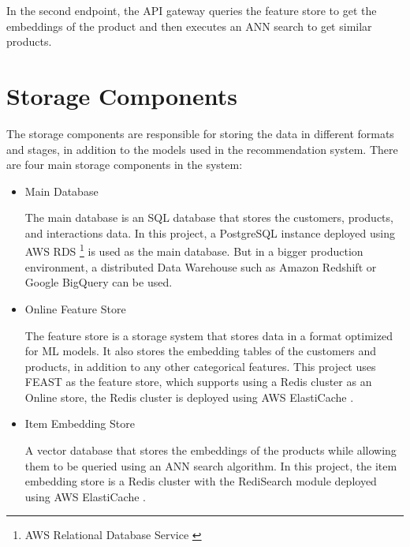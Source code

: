 In the second endpoint, the API gateway queries the feature store to get the embeddings of the product and then executes an ANN search to get similar products.

\section{Storage Components}

The storage components are responsible for storing the data in different formats and stages, in addition to the models used in the recommendation system.
There are four main storage components in the system:

\begin{itemize}
    \item Main Database
    \begin{displayquote}
        The main database is an SQL database that stores the customers, products, and
         interactions data. In this project, a PostgreSQL \cite{Postgres} instance 
         deployed using AWS RDS \footnote{AWS Relational Database Service \cite{AwsRDS}}
         is used as the main database. 
         But in a bigger production environment, a distributed Data Warehouse such as 
         Amazon Redshift \cite{AwsRedshift} or Google BigQuery \cite{GoogleBigQuery} can be used.
    \end{displayquote}
    \item Online Feature Store
    \begin{displayquote}
        The feature store is a storage system that stores data in a format optimized for ML models. \cite{NvidiaFeatureStores}
        It also stores the embedding tables of the customers 
        and products, in addition to any other categorical features.
        This project uses FEAST \cite{feast} as the feature store, which supports using a Redis \cite{Redis} 
        cluster as an Online store, the Redis cluster is deployed using AWS ElastiCache \cite{AwsElastiCache}.
    \end{displayquote}

    \item Item Embedding Store
    \begin{displayquote}
        A vector database that stores the embeddings of the products
        while allowing them to be queried using an ANN search algorithm. 
        In this project, the item embedding store is a Redis \cite{Redis} cluster with the RediSearch \cite{RediSearch} module deployed using AWS ElastiCache \cite{AwsElastiCache}.
    \end{displayquote}


\end{itemize}

